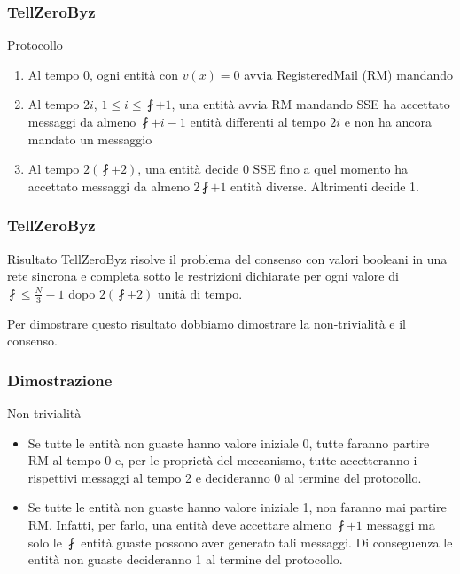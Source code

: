 		\begin{frame}
			\frametitle{TellZeroByz}
			\begin{block}{Protocollo}
				\begin{enumerate}
					\item Al tempo 0, ogni entità \nguasta con $v(x) = 0$ avvia RegisteredMail (RM) mandando 
					\item Al tempo $2i$, $1 \leq i \leq \fint+1$, una entità \nguasta avvia RM mandando  SSE ha accettato messaggi da almeno $\fint + i - 1$ entità differenti al tempo $2i$ e non ha ancora mandato un messaggio 
					\item Al tempo $2(\fint + 2)$, una entità \nguasta decide 0 SSE fino a quel momento ha accettato messaggi da almeno $2\fint + 1$ entità diverse. Altrimenti decide 1.
				\end{enumerate}
			\end{block}	
		\end{frame}
	
		\begin{frame}
			\frametitle{TellZeroByz}	
			\begin{block}{Risultato}
				TellZeroByz risolve il problema del consenso con valori booleani in una rete sincrona e completa sotto le restrizioni dichiarate per ogni valore di $\fint \leq \frac{N}{3} - 1$ dopo $2(\fint + 2)$ unità di tempo.
			\end{block}
			Per dimostrare questo risultato dobbiamo dimostrare la non-trivialità e il consenso. 
		\end{frame}
	
		\begin{frame}
			\frametitle{Dimostrazione}	
			\begin{block}{Non-trivialità}
				\begin{itemize}
					\item Se tutte le entità non guaste hanno valore iniziale 0, tutte faranno partire RM al tempo 0 e, per le proprietà del meccanismo, tutte accetteranno i rispettivi messaggi al tempo 2 e decideranno 0 al termine del protocollo.
					\item Se tutte le entità non guaste hanno valore iniziale 1, non faranno mai partire RM. Infatti, per farlo, una entità deve accettare almeno $\fint + 1$ messaggi ma solo le $\fint$ entità guaste possono aver generato tali messaggi. Di conseguenza le entità non guaste decideranno 1 al termine del protocollo.
				\end{itemize}			
			\end{block}
		\end{frame}
	
